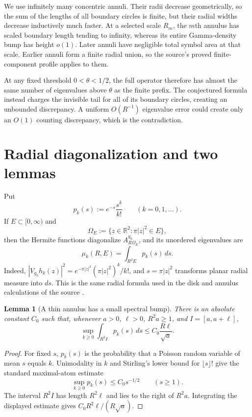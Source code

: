 \documentclass[11pt]{article}
\newtheorem{lemma}{Lemma}
\newcommand{\R}{\mathbb R}
\begin{document}
We use infinitely many concentric annuli.  Their radii decrease geometrically,
so the sum of the lengths of all boundary circles is finite, but their radial
widths decrease inductively much faster.  At a selected scale $R_m$, the
$m$th annulus has scaled boundary length tending to infinity, whereas its
entire Gamma-density bump has height $o(1)$.  Later annuli have negligible
total symbol area at that scale.  Earlier annuli form a finite radial union,
so the source's proved finite-component profile applies to them.

At any fixed threshold $0<\theta<1/2$, the full operator therefore has almost
the same number of eigenvalues above $\theta$ as the finite prefix.  The
conjectured formula instead charges the invisible tail for all of its boundary
circles, creating an unbounded discrepancy.  A uniform $O(R^{-1})$
eigenvalue error could create only an $O(1)$ counting discrepancy, which is
the contradiction.

\section{Radial diagonalization and two lemmas}

Put
\[
 p_k(s):=e^{-s}\frac{s^k}{k!}\qquad(k=0,1,\ldots).
\]
If $E\subset[0,\infty)$ and
\[
 \Omega_E:=\{z\in\R^2:\pi|z|^2\in E\},
\]
then the Hermite functions diagonalize $A_{R\Omega_E}^{g_0}$, and its
unordered eigenvalues are
\begin{equation}\label{eq:gamma-eigs}
 \mu_k(R,E)=\int_{R^2E}p_k(s)\,ds.
\end{equation}
Indeed,
$|V_{g_0}h_k(z)|^2=e^{-\pi|z|^2}(\pi|z|^2)^k/k!$, and
$s=\pi|z|^2$ transforms planar radial measure into $ds$.  This is the same
radial formula used in the disk and annulus calculations of the source
\cite[Section 2]{Halvdansson}.

\begin{lemma}[A thin annulus has a small spectral bump]\label{lem:bump}
There is an absolute constant $C_0$ such that, whenever $a>0$, $\ell>0$,
$R^2a\geq1$, and $I=[a,a+\ell]$,
\[
 \sup_{k\geq0}\int_{R^2I}p_k(s)\,ds
 \leq C_0\frac{R\ell}{\sqrt a}.
\]
\end{lemma}

\begin{proof}
For fixed $s$, $p_k(s)$ is the probability that a Poisson random variable of
mean $s$ equals $k$.  Unimodality in $k$ and Stirling's lower bound for
$\lfloor s\rfloor!$ give the standard maximal-atom estimate
\[
 \sup_{k\geq0}p_k(s)\leq C_0s^{-1/2}\qquad(s\geq1).
\]
The interval $R^2I$ has length $R^2\ell$ and lies to the right of $R^2a$.
Integrating the displayed estimate gives
$C_0R^2\ell/(R\sqrt a)$.
\end{proof}
\end{document}
